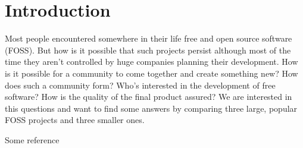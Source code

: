 \section{Introduction}


Most people encountered somewhere in their life free and open source software (FOSS). But how is it possible that such projects persist although most of the time they aren't controlled by huge companies planning their development. How is it possible for a community to come together and create something new? How does such a community form? Who's interested in the development of free software? How is the quality of the final product assured? We are interested in this questions and want to find some answers by comparing three large, popular FOSS projects and three smaller ones.

Some reference \cite{zach.2008}

